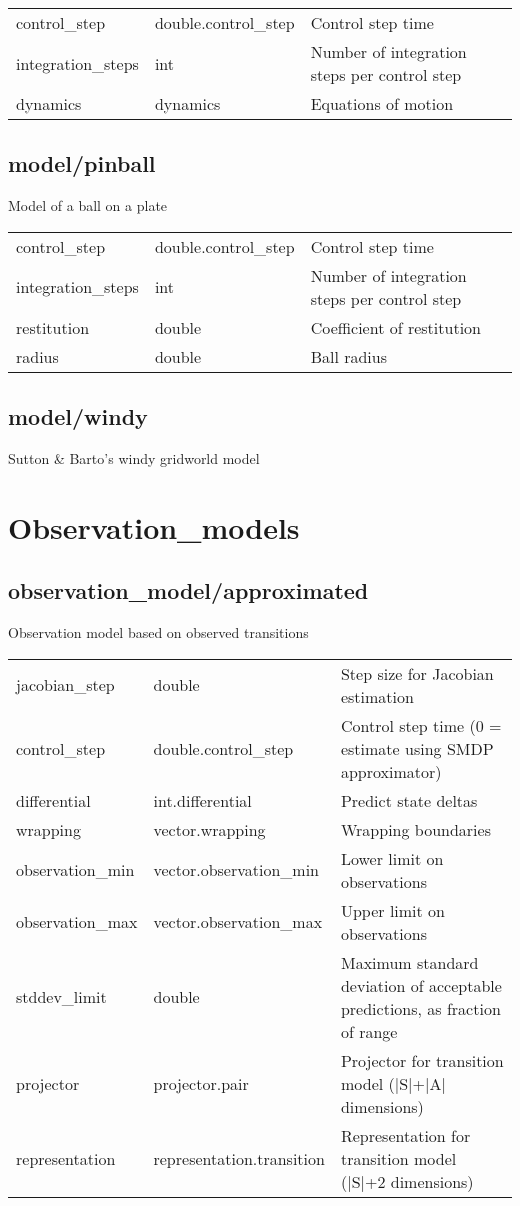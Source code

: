 \noindent\begin{tabular}{@{}lll@{}}
control\_step&double.control\_step&Control step time\\
integration\_steps&int&Number of integration steps per control step\\
dynamics&dynamics&Equations of motion\\
\end{tabular}
\subsection{model/pinball}
\noindent Model of a ball on a plate\\

\noindent\begin{tabular}{@{}lll@{}}
control\_step&double.control\_step&Control step time\\
integration\_steps&int&Number of integration steps per control step\\
restitution&double&Coefficient of restitution\\
radius&double&Ball radius\\
\end{tabular}
\subsection{model/windy}
\noindent Sutton \& Barto's windy gridworld model\\

\section{Observation\_models}
\subsection{observation\_model/approximated}
\noindent Observation model based on observed transitions\\

\noindent\begin{tabular}{@{}lll@{}}
jacobian\_step&double&Step size for Jacobian estimation\\
control\_step&double.control\_step&Control step time (0 = estimate using SMDP approximator)\\
differential&int.differential&Predict state deltas\\
wrapping&vector.wrapping&Wrapping boundaries\\
observation\_min&vector.observation\_min&Lower limit on observations\\
observation\_max&vector.observation\_max&Upper limit on observations\\
stddev\_limit&double&Maximum standard deviation of acceptable predictions, as fraction of range\\
projector&projector.pair&Projector for transition model (|S|+|A| dimensions)\\
representation&representation.transition&Representation for transition model (|S|+2 dimensions)\\
\end{tabular}
